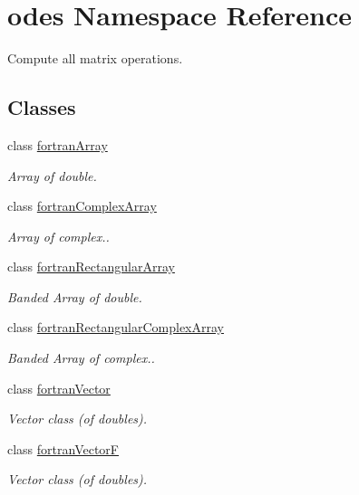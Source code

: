\hypertarget{namespaceodes}{}\section{odes Namespace Reference}
\label{namespaceodes}


Compute all matrix operations.  


\subsection*{Classes}
\begin{DoxyCompactItemize}
\item 
class \hyperlink{classodes_1_1fortranArray}{fortran\+Array}
\begin{DoxyCompactList}\small\item\em Array of double. \end{DoxyCompactList}\item 
class \hyperlink{classodes_1_1fortranComplexArray}{fortran\+Complex\+Array}
\begin{DoxyCompactList}\small\item\em Array of complex.. \end{DoxyCompactList}\item 
class \hyperlink{classodes_1_1fortranRectangularArray}{fortran\+Rectangular\+Array}
\begin{DoxyCompactList}\small\item\em Banded Array of double. \end{DoxyCompactList}\item 
class \hyperlink{classodes_1_1fortranRectangularComplexArray}{fortran\+Rectangular\+Complex\+Array}
\begin{DoxyCompactList}\small\item\em Banded Array of complex.. \end{DoxyCompactList}\item 
class \hyperlink{classodes_1_1fortranVector}{fortran\+Vector}
\begin{DoxyCompactList}\small\item\em Vector class (of doubles). \end{DoxyCompactList}\item 
class \hyperlink{classodes_1_1fortranVectorF}{fortran\+Vector\+F}
\begin{DoxyCompactList}\small\item\em Vector class (of doubles). \end{DoxyCompactList}\item 

\end{DoxyCompactItemize}

